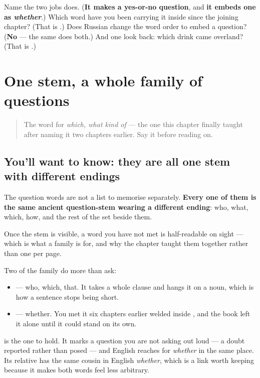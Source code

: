 \begin{tcolorbox}[breakable,colback=teal!4,colframe=teal!35!black,title={Before you move on}]
Name the two jobs \textbf{} does. (\textbf{It makes a yes-or-no question}, and \textbf{it embeds one as \emph{whether}}.) Which word have you been carrying it inside since the joining chapter? (That is \textbf{}.) Does Russian change the word order to embed a question? (\textbf{No} — the same \textbf{} does both.) And one look back: which drink came overland? (That is \textbf{}.)
\end{tcolorbox}
\section[\texorpdfstring{\ru{какой} · \ru{который} … (kakóy, kotóryy, li)}{какой · который … (kakóy, kotóryy, li)}]{One stem, a whole family of questions}

\label{lesson:RU-R22-second-pass-the-question-family}



\begin{quote}
The word for \emph{which, what kind of} — the one this chapter finally taught after naming it two chapters earlier. Say it before reading on.
\end{quote}

\subsection*{You'll want to know: they are all one stem with different endings}
The question words are not a list to memorise separately. \textbf{Every one of them is the same ancient question-stem wearing a different ending}:  who,  what,  which,  how, and the rest of the set beside them.

Once the stem is visible, a word you have not met is half-readable on sight — which is what a family is for, and why the chapter taught them together rather than one per page.

\begin{grammarlens}[title={Grammar Lens: \ru{который} hangs a clause, \ru{ли} hangs a doubt}]
Two of the family do more than ask:

\begin{itemize}
\raggedright
  \item \textbf{} — who, which, that. It takes a whole clause and hangs it on a noun, which is how a sentence stops being short.
  \item \textbf{} — whether. You met it six chapters earlier welded inside \textbf{}, and the book left it alone until it could stand on its own.
\end{itemize}

\textbf{} is the one to hold. It marks a question you are not asking out loud — a doubt reported rather than posed — and English reaches for \emph{whether} in the same place. Its relative \textbf{} has the same cousin in English \emph{whether}, which is a link worth keeping because it makes both words feel less arbitrary.
\end{grammarlens}

